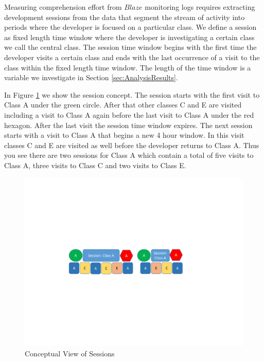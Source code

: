 Measuring comprehension effort from $Blaze$ monitoring logs requires extracting development sessions from the data that segment the stream of activity into periods where the developer is focused on a particular class.  We define a session as fixed length time window where the developer is investigating a certain class we call the central class.  The session time window begins with the first time the developer visits a certain class and ends with the last occurrence of a visit to the class within the fixed length time window.  The length of the time window is a variable we investigate in Section \ref{sec:AnalysisResults}.  

In Figure \ref{fig:SessionDataConcept} we show the session concept.  The session starts with the first visit to Class A under the green circle.  After that other classes C and E are visited including a visit to Class A again before the last visit to Class A under the red hexagon.  After the last visit the session time window expires.  The next session starts with a visit to Class A that begins a new 4 hour window.  In this visit classes C and E are visited as well before the developer returns to Class A.  Thus you see there are two sessions for Class A which contain a total of five visits to Class A, three visits to Class C and two visits to Class E.
\begin{figure}
	\centering
	\includegraphics[width=\linewidth]{SessionDataConcept.pdf}
	\caption{Conceptual View of Sessions}
	\label{fig:SessionDataConcept}
\end{figure}

